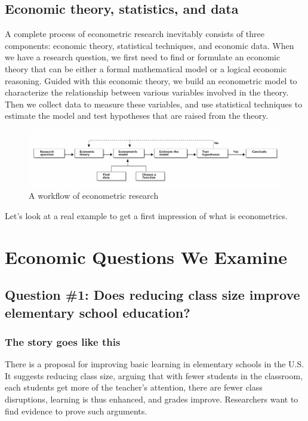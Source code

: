 \documentclass[a4paper,11pt]{article}
\begin{document}
\subsection*{Economic theory, statistics, and data}
\label{sec:orgcf0772b}

A complete process of econometric research inevitably consists of three
components: economic theory, statistical techniques, and economic
data. When we have a research question, we first need to find or
formulate an economic theory that can be either a formal mathematical
model or a logical economic reasoning. Guided with this economic
theory, we build an econometric model to characterize the relationship
between various variables involved in the theory. Then we collect data
to measure these variables, and use statistical techniques to estimate
the model and test hypotheses that are raised from the theory.

\begin{figure}[htbp]
\centering
\includegraphics[width=1.0\textwidth]{figure/econometric_workflow.png}
\caption{\label{fig:org82e6477}
A workflow of econometric research}
\end{figure}

Let's look at a real example to get a first impression of what is
econometrics.


\section{Economic Questions We Examine}
\label{sec:orge0f895c}

\subsection*{Question \#1: Does reducing class size improve elementary school education?}
\label{sec:org64c1569}

\subsubsection*{The story goes like this}
\label{sec:org1f30ffc}

There is a proposal for improving basic learning in elementary schools
in the U.S. It suggests reducing class size, arguing that with fewer
students in the classroom, each students get more of the teacher's
attention, there are fewer class disruptions, learning is thus
enhanced, and grades improve. Researchers want to find evidence to
prove such arguments.
\end{document}
